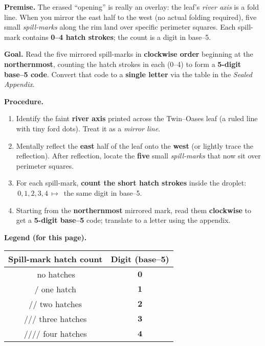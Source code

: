 \documentclass[11pt]{article}
\begin{document}
\begin{itemize}
\medskip
\noindent\textbf{Premise.} The erased “opening” is really an overlay: the leaf’s \emph{river axis} is a fold line. When you mirror the east half to the west (no actual folding required), five small \emph{spill-marks} along the rim land over specific perimeter squares. Each spill-mark contains \textbf{0–4 hatch strokes}; the count is a digit in base–5.

\medskip
\noindent\textbf{Goal.} Read the five mirrored spill-marks in \textbf{clockwise order} beginning at the \textbf{northernmost}, counting the hatch strokes in each (0–4) to form a \textbf{5-digit base–5 code}. Convert that code to a \textbf{single letter} via the table in the \emph{Sealed Appendix}.

\medskip
\noindent\textbf{Procedure.}
\begin{enumerate}\setlength\itemsep{0.2em}
  \item Identify the faint \textbf{river axis} printed across the Twin–Oases leaf (a ruled line with tiny ford dots). Treat it as a \emph{mirror line}.
  \item Mentally reflect the \textbf{east} half of the leaf onto the \textbf{west} (or lightly trace the reflection). After reflection, locate the \textbf{five} small \emph{spill-marks} that now sit over perimeter squares.
  \item For each spill-mark, \textbf{count the short hatch strokes} inside the droplet: \(\,0,1,2,3,4\,\mapsto\,\) the same digit in base–5.
  \item Starting from the \textbf{northernmost} mirrored mark, read them \textbf{clockwise} to get a \textbf{5-digit base–5} code; translate to a letter using the appendix.
\end{enumerate}

\medskip
\noindent\textbf{Legend (for this page).}
\begin{center}
\begin{tabular}{c|c}
\textbf{Spill-mark hatch count} & \textbf{Digit (base–5)} \\
\hline
\(\,\)no hatches & \(\mathbf{0}\) \\
\(/\) one hatch & \(\mathbf{1}\) \\
\(/\!\!/\) two hatches & \(\mathbf{2}\) \\
\(/\!\!/\!\!/\) three hatches & \(\mathbf{3}\) \\
\(/\!\!/\!\!/\!\!/\) four hatches & \(\mathbf{4}\) \\
\end{tabular}
\end{center}


\end{itemize}
\end{document}
